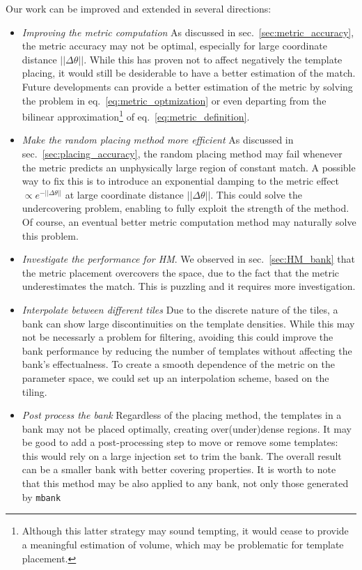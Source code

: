 \documentclass[twocolumn,showpacs,preprintnumbers,nofootinbib,prd,
superscriptaddress,10pt]{revtex4-2}
\begin{document}
Our work can be improved and extended in several directions:
\begin{itemize}
	\item {\it Improving the metric computation} As discussed in sec.~\ref{sec:metric_accuracy}, the metric accuracy may not be optimal, especially for large coordinate distance $||\Delta\theta||$. While this has proven not to affect negatively the template placing, it would still be desiderable to have a better estimation of the match. Future developments can provide a better estimation of the metric by solving the problem in eq.~\eqref{eq:metric_optmization} or even departing from the bilinear approximation\footnote{
Although this latter strategy may sound tempting, it would cease to provide a meaningful estimation of volume, which may be problematic for template placement.} of eq.~\eqref{eq:metric_definition}.
	
	\item {\it Make the random placing method more efficient} As discussed in sec.~\ref{sec:placing_accuracy}, the random placing method may fail whenever the metric predicts an unphysically large region of constant match. A possible way to fix this is to introduce an exponential damping to the metric effect $\propto e^{-||\Delta\theta||}$ at large coordinate distance $||\Delta\theta||$. This could solve the undercovering problem, enabling to fully exploit the strength of the method.
	Of course, an eventual better metric computation method may naturally solve this problem.
	
	\item {\it Investigate the performance for HM}. We observed in sec.~\ref{sec:HM_bank} that the metric placement overcovers the space, due to the fact that the metric underestimates the match. This is puzzling and it requires more investigation.
	
	\item {\it Interpolate between different tiles} Due to the discrete nature of the tiles, a bank can show large discontinuities on the template densities. While this may not be necessarly a problem for filtering, avoiding this could improve the bank performance by reducing the number of templates without affecting the bank's effectualness. To create a smooth dependence of the metric on the parameter space, we could set up an interpolation scheme, based on the tiling.
	
	\item {\it Post process the bank} Regardless of the placing method, the templates in a bank may not be placed optimally, creating over(under)dense regions. It may be good to add a post-processing step to move or remove some templates: this would rely on a large injection set to trim the bank. The overall result can be a smaller bank with better covering properties.
	It is worth to note that this method may be also applied to any bank, not only those generated by \texttt{mbank} 
\end{itemize}
\end{document}

